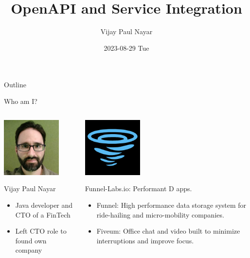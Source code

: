 \documentclass[bigger]{beamer}
\author{Vijay Paul Nayar}
\date{2023-08-29 Tue}
\title{OpenAPI and Service Integration}
\begin{document}
\maketitle
\begin{frame}{Outline}
\tableofcontents
\end{frame}


\begin{frame}[label={sec:org8fcd05a}]{Who am I?}
\begin{columns}
\begin{column}{0.4\columnwidth}
\begin{center}
\includegraphics[width=3cm]{PortraitLowRes.jpg}
\end{center}

Vijay Paul Nayar
\begin{itemize}
\item Java developer and CTO of a FinTech
\item Left CTO role to found own company
\end{itemize}
\end{column}

\begin{column}{0.6\columnwidth}
\begin{center}
\includegraphics[width=3cm]{funnel-icon.png}
\end{center}

\alert{Funnel-Labs.io}: Performant D apps.
\begin{itemize}
\item \alert{Funnel}: High performance data storage system for ride-hailing and micro-mobility companies.
\item \alert{Fiveum}: Office chat and video built to minimize interruptions and improve focus.
\end{itemize}
\end{column}
\end{columns}
\end{frame}
\end{document}
